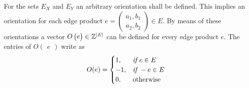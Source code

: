 %	

\begin{definition}[Orientation]
	For the sets $E_X$ and $E_Y$ an arbitrary orientation shall be defined. This implies an orientation for each edge product $e = \begin{pmatrix} a_1,b_1 \\ a_2,b_2 \end{pmatrix} \in E$.
	By means of these orientations a vector $O\begin{pmatrix}e\end{pmatrix} \in \mathbb{Z}^{\lvert E\rvert}$ can be defined for every edge product $e$. The entries of $O\begin{pmatrix}e\end{pmatrix}$ write as
	\begin{equation}
		O(e) = \begin{cases}
			1,& \emph{if } e \in E\\
			-1,& \emph{if } -e \in E\\
			0,& \text{otherwise}
		\end{cases}
	\end{equation}
\end{definition}

